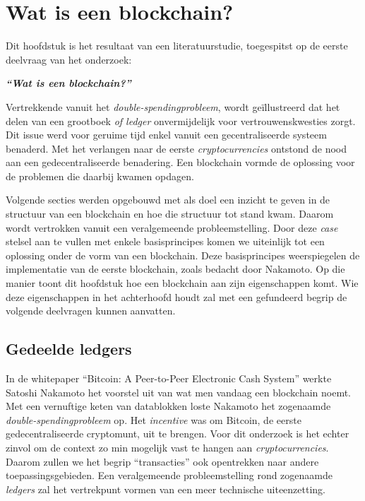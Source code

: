 \chapter{Wat is een blockchain?}
\label{ch:wat-is-een-blockchain}


Dit hoofdstuk is het resultaat van een literatuurstudie, toegespitst op de eerste deelvraag van het onderzoek:

\begin{center}
	\textit{\textbf{``Wat is een blockchain?''}}
\end{center}

Vertrekkende vanuit het \textit{double-spendingprobleem}, wordt geïllustreerd dat het delen van een grootboek \textit{of ledger} onvermijdelijk voor vertrouwenskwesties zorgt. Dit issue werd voor geruime tijd enkel vanuit een gecentraliseerde systeem benaderd. Met het verlangen naar de eerste \textit{cryptocurrencies} ontstond de nood aan een gedecentraliseerde benadering. Een blockchain vormde de oplossing voor de problemen die daarbij kwamen opdagen.

Volgende secties werden opgebouwd met als doel een inzicht te geven in de structuur van een blockchain en hoe die structuur tot stand kwam. Daarom wordt vertrokken vanuit een veralgemeende probleemstelling. Door deze \textit{case} stelsel aan te vullen met enkele basisprincipes komen we uiteinlijk tot een oplossing onder de vorm van een blockchain. Deze basisprincipes weerspiegelen de implementatie van de eerste blockchain, zoals bedacht door Nakamoto. Op die manier toont dit hoofdstuk hoe een blockchain aan zijn eigenschappen komt. Wie deze eigenschappen in het achterhoofd houdt zal met een gefundeerd begrip de volgende deelvragen kunnen aanvatten.



\section{Gedeelde ledgers}
\label{sec:probeleemstelling}
In de whitepaper ``Bitcoin: A Peer-to-Peer Electronic Cash System'' werkte Satoshi Nakamoto het voorstel uit van wat men vandaag een blockchain noemt. Met een vernuftige keten van datablokken loste Nakamoto het zogenaamde \textit{double-spendingprobleem} op. Het \textit{incentive} was om Bitcoin, de eerste gedecentraliseerde cryptomunt, uit te brengen. Voor dit onderzoek is het echter zinvol om de context zo min mogelijk vast te hangen aan \textit{cryptocurrencies}. Daarom zullen we het begrip ``transacties'' ook opentrekken naar andere toepassingsgebieden. Een veralgemeende probleemstelling rond zogenaamde \textit{ledgers} zal het vertrekpunt vormen van een meer technische uiteenzetting.


